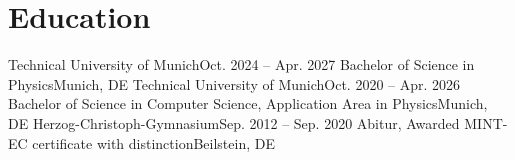 \section{Education}
  \resumeSubHeadingListStart
    \resumeSubheading
      {Technical University of Munich}{Oct. 2024 -- Apr. 2027}
      {Bachelor of Science in Physics}{Munich, DE}
    \resumeSubheading
      {Technical University of Munich}{Oct. 2020 -- Apr. 2026}
      {Bachelor of Science in Computer Science, Application Area in Physics}{Munich, DE}
    \resumeSubheading
      {Herzog-Christoph-Gymnasium}{Sep. 2012 -- Sep. 2020}
      {Abitur, Awarded MINT-EC certificate with distinction}{Beilstein, DE}
  \resumeSubHeadingListEnd
